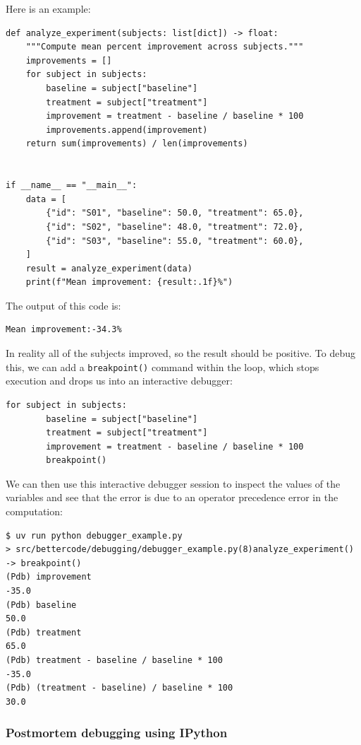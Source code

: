 Here is an example:

\begin{lstlisting}[style=Python]
def analyze_experiment(subjects: list[dict]) -> float:
    """Compute mean percent improvement across subjects."""
    improvements = []
    for subject in subjects:
        baseline = subject["baseline"]
        treatment = subject["treatment"]
        improvement = treatment - baseline / baseline * 100
        improvements.append(improvement)
    return sum(improvements) / len(improvements)


if __name__ == "__main__":
    data = [
        {"id": "S01", "baseline": 50.0, "treatment": 65.0},
        {"id": "S02", "baseline": 48.0, "treatment": 72.0},
        {"id": "S03", "baseline": 55.0, "treatment": 60.0},
    ]
    result = analyze_experiment(data)
    print(f"Mean improvement: {result:.1f}%")
\end{lstlisting}

The output of this code is:

\begin{lstlisting}[style=shell, numbers=none]
Mean improvement:-34.3%
\end{lstlisting}

In reality all of the subjects improved, so the result should be positive.  To debug this, we can add a \texttt{breakpoint()} command within the loop, which stops execution and drops us into an interactive debugger:

\begin{lstlisting}[style=Python]
for subject in subjects:
        baseline = subject["baseline"]
        treatment = subject["treatment"]
        improvement = treatment - baseline / baseline * 100 
        breakpoint()
\end{lstlisting}

We can then use this interactive debugger session to inspect the values of the variables and see that the error is due to an operator precedence error in the computation:

\begin{lstlisting}[style=shell]
$ uv run python debugger_example.py
> src/bettercode/debugging/debugger_example.py(8)analyze_experiment()
-> breakpoint()
(Pdb) improvement
-35.0
(Pdb) baseline
50.0
(Pdb) treatment
65.0
(Pdb) treatment - baseline / baseline * 100
-35.0
(Pdb) (treatment - baseline) / baseline * 100
30.0
\end{lstlisting}

\subsubsection{Postmortem debugging using IPython}

